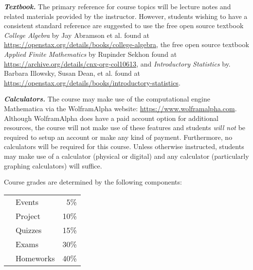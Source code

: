 \documentclass[11pt,letterpaper]{article}
\begin{document}
{\itshape\bfseries\color{stacred}Textbook.} The primary reference for course topics will be lecture notes and related materials provided by the instructor. However, students wishing to have a consistent standard reference are suggested to use the free open source textbook \textit{College Algebra} by Jay Abramson et al. found at \url{https://openstax.org/details/books/college-algebra}, the free open source textbook \textit{Applied Finite Mathematics} by Rupinder Sekhon found at \url{https://archive.org/details/cnx-org-col10613}, and \textit{Introductory Statistics} by. Barbara Illowsky, Susan Dean, et al. found at \href{https://openstax.org/details/books/introductory-statistics}{https://openstax.org/details/books/introductory-statistics}. \pspace

{\itshape\bfseries\color{stacred}Calculators.} The course may make use of the computational engine Mathematica via the WolframAlpha website: \url{https://www.wolframalpha.com}. Although WolframAlpha does have a paid account option for additional resources, the course will not make use of these features and students {\itshape will not} be required to setup an account or make any kind of payment. Furthermore, no calculators will be required for this course. Unless otherwise instructed, students may make use of a calculator (physical or digital) and any calculator (particularly graphing calculators) will suffice. 
\sectionbreak









Course grades are determined by the following components: \par
	\begin{table}[!ht]
        \begin{tabular}{clr}
	& Events & 5\% \\
	& Project & 10\% \\
	& Quizzes & 15\% \\
	& Exams & 30\% \\
	& Homeworks & 40\% 
        \end{tabular} 
        \end{table}
\sectionbreak
\end{document}
